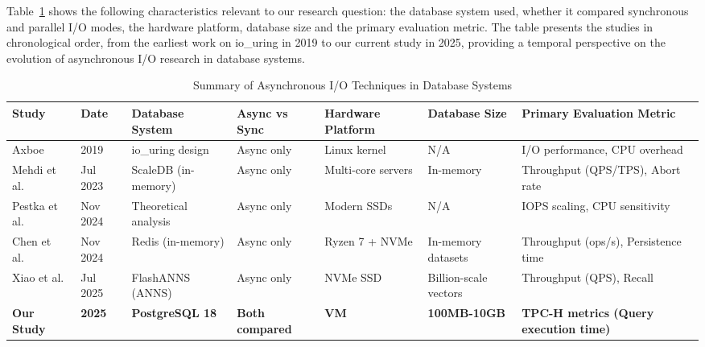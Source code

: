 \documentclass[conference]{IEEEtran}
\begin{document}
Table~\ref{tab:tools} shows the following characteristics relevant to our research question: the database system used, whether it compared synchronous and parallel I/O modes, the hardware platform, database size and the primary evaluation metric. The table presents the studies in chronological order, from the earliest work on io\_uring in 2019 to our current study in 2025, providing a temporal perspective on the evolution of asynchronous I/O research in database systems.

\begin{table}[h]
    \centering
    \caption{Summary of Asynchronous I/O Techniques in Database Systems}
    \begin{tabularx}{\textwidth}{l l l l l l X}
    \toprule
    \textbf{Study} & \textbf{Date} & \textbf{Database System} & \textbf{Async vs Sync} & \textbf{Hardware Platform} & \textbf{Database Size} & \textbf{Primary Evaluation Metric} \\
    \midrule
    Axboe~\cite{axboe2019io_uring} & 2019 & io\_uring design & Async only & Linux kernel & N/A & I/O performance, CPU overhead \\
    Mehdi et al.~\cite{Mehdi2023ScaleDB} & Jul 2023 & ScaleDB (in-memory) & Async only & Multi-core servers & In-memory & Throughput (QPS/TPS), Abort rate \\
    Pestka et al.~\cite{pestka2024aio} & Nov 2024 & Theoretical analysis & Async only & Modern SSDs & N/A & IOPS scaling, CPU sensitivity \\
    Chen et al.~\cite{chen_uring_2025} & Nov 2024 & Redis (in-memory) & Async only & Ryzen 7 + NVMe & In-memory datasets & Throughput (ops/s), Persistence time \\
    Xiao et al.~\cite{xiao_breaking_2025} & Jul 2025 & FlashANNS (ANNS) & Async only & NVMe SSD & Billion-scale vectors & Throughput (QPS), Recall \\
    \textbf{Our Study} & \textbf{2025} & \textbf{PostgreSQL 18} & \textbf{Both compared} & \textbf{VM} & \textbf{100MB-10GB} & \textbf{TPC-H metrics (Query execution time)} \\
    \midrule
    \end{tabularx}
    \label{tab:tools}
\end{table}
\end{document}
